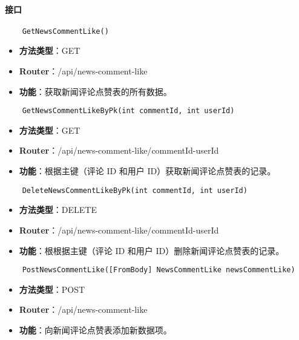 \paragraph{接口}

\begin{verbatim}
	GetNewsCommentLike()
\end{verbatim}

\begin{itemize}
	\item \textbf{方法类型}：GET
	\item \textbf{Router}：/api/news-comment-like
	\item \textbf{功能}：获取新闻评论点赞表的所有数据。
\end{itemize}

\begin{verbatim}
	GetNewsCommentLikeByPk(int commentId, int userId)
\end{verbatim}

\begin{itemize}
	\item \textbf{方法类型}：GET
	\item \textbf{Router}：/api/news-comment-like/{commentId}-{userId}
	\item \textbf{功能}：根据主键（评论 ID 和用户 ID）获取新闻评论点赞表的记录。
\end{itemize}

\begin{verbatim}
	DeleteNewsCommentLikeByPk(int commentId, int userId)
\end{verbatim}

\begin{itemize}
	\item \textbf{方法类型}：DELETE
	\item \textbf{Router}：/api/news-comment-like/{commentId}-{userId}
	\item \textbf{功能}：根根据主键（评论 ID 和用户 ID）删除新闻评论点赞表的记录。
\end{itemize}

\begin{verbatim}
	PostNewsCommentLike([FromBody] NewsCommentLike newsCommentLike)
\end{verbatim}

\begin{itemize}
	\item \textbf{方法类型}：POST
	\item \textbf{Router}：/api/news-comment-like
	\item \textbf{功能}：向新闻评论点赞表添加新数据项。
\end{itemize}

